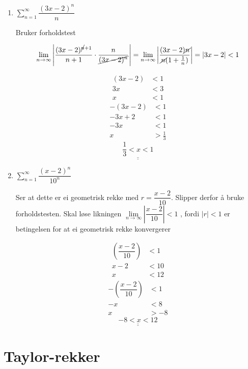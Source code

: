 \documentclass[11pt]{article}
\theoremstyle{definition}
\theoremstyle{definition}
\theoremstyle{definition}
\theoremstyle{definition}
\theoremstyle{definition}
\theoremstyle{definition}
\begin{document}
		\begin{enumerate}
			\item \(\displaystyle{\sum_{n=1}^{\infty}\dfrac{(3x-2)^n}{n}}\)
			
			Bruker forholdstest
			
			\begin{align*}
			\lim\limits_{n\rightarrow \infty}\left| \dfrac{(3x-2)^{\cancel{n}+1}}{n+1}\cdot \dfrac{n}{\cancel{(3x-2)^n}} \right| = \lim\limits_{n\rightarrow \infty}\left|  \dfrac{(3x-2)\cancel{n}}{\cancel{n}(1+\frac{1}{n})}\right|=\left|  3x-2 \right| <1
			\end{align*}
			
			\begin{align*}
			(3x - 2) &< 1		\\
			3x&<3			\\
			x&<1			
			\end{align*}
			\begin{align*}
			-(3x-2)&<1\\
			-3x+2&<1\\
			-3x&<1\\
			x&>\frac{1}{3}
			\end{align*}
			\[\underline{\underline{\frac{1}{3}<x<1}} \]
			\newpage
			\item \(\displaystyle{\sum_{n=1}^{\infty}\dfrac{(x-2)^n}{10^n}}\)
			
			Ser at dette er ei geometrisk rekke med \(r=\dfrac{x-2}{10}\). Slipper derfor å bruke forholdstesten. Skal løse likningen \(\lim\limits_{n\rightarrow \infty}\left| \dfrac{x-2}{10} \right|<1 \) , fordi \(|r|<1\) er betingelsen for at ei geometrisk rekke konvergerer
			
			\begin{align*}
			\left( \dfrac{x-2}{10}\right)  &<1\\
			x-2&<10 \\
			x&<12
			\end{align*}
			\begin{align*}
			-\left( \dfrac{x-2}{10}\right)&<1\\
			-x&<8\\
			x&>-8 
			\end{align*}
			\[\underline{\underline{-8<x<12}}\]
		\end{enumerate}
		

		
		\newpage
		
		\section{Taylor-rekker}
		
\end{document}
